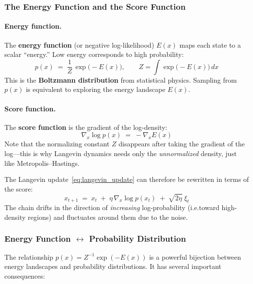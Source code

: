 \documentclass[12pt, a4paper]{article}
\begin{document}
\subsubsection{The Energy Function and the Score Function}

\paragraph{Energy function.}
The \textbf{energy function} (or negative log-likelihood)
$E(x)$ maps each state to a scalar ``energy.'' Low energy
corresponds to high probability:
\begin{equation}
    p(x) \;=\; \frac{1}{Z}\,\exp\!\bigl(-E(x)\bigr),
    \qquad
    Z = \int \exp\!\bigl(-E(x)\bigr)\,dx
    \label{eq:boltzmann}
\end{equation}
This is the \textbf{Boltzmann distribution} from statistical
physics.  Sampling from $p(x)$ is equivalent to exploring the
energy landscape $E(x)$.

\paragraph{Score function.}
The \textbf{score function} is the gradient of the
log-density:
\begin{equation}
    \nabla_x \log p(x)
    \;=\; -\nabla_x E(x)
    \label{eq:score}
\end{equation}
Note that the normalizing constant $Z$ disappears after
taking the gradient of the log---this is why Langevin dynamics
needs only the \emph{unnormalized} density, just like
Metropolis--Hastings.

The Langevin update~\eqref{eq:langevin_update} can
therefore be rewritten in terms of the score:
\begin{equation}
    x_{t+1} \;=\; x_t
    \;+\; \eta\,\nabla_x \log p(x_t)
    \;+\; \sqrt{2\eta}\;\xi_t
    \label{eq:langevin_score}
\end{equation}
The chain drifts in the direction of \emph{increasing}
log-probability (i.e.\@ toward high-density regions) and
fluctuates around them due to the noise.

\subsubsection{Energy Function $\leftrightarrow$ Probability
               Distribution}
\label{sec:energy_prob}

The relationship $p(x) = Z^{-1}\exp(-E(x))$ is a powerful
bijection between energy landscapes and probability
distributions.  It has several important consequences:
\end{document}
